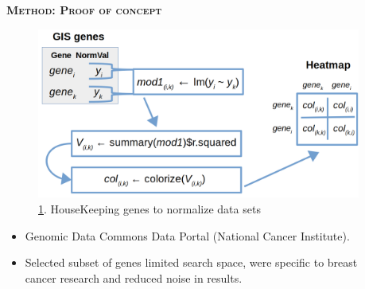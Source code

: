 \documentclass[final,t]{beamer}
\begin{document}
\begin{frame}{}
\begin{columns}
\begin{column}{.5\linewidth}
\begin{block}{\textsc{\textbf{Method: Proof of concept}}}
\begin{center}
				\begin{center}\end{center} %
				
				\begin{figure}
					\includegraphics[scale = 0.60]{graphics/lm.png}
					\caption{\ref{fig:lm}. HouseKeeping genes to normalize data sets}
					\label{fig:lm}
				\end{figure}
			\end{center}

				\begin{itemize}
					\item Genomic Data Commons Data Portal (National Cancer Institute).
					\item Selected subset of genes limited search space, were specific to breast cancer research and reduced noise in results.
					
				\end{itemize}
			\vspace*{3mm}
                \end{block}
	\end{column}

%
%
	\begin{column}{.5\linewidth}
%
%
%


\end{column}
\end{columns}
\end{frame}
\end{document}
